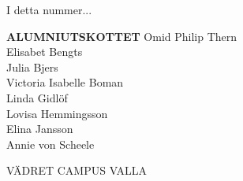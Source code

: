 \documentclass[10pt,final,hyphenatedtitles]{papertex}
\begin{document}
\begin{frontpage}
\begin{indexblock}{I detta nummer...}




\end{indexblock}



\begin{authorblock}
\textbf{ALUMNIUTSKOTTET}
Omid Philip Thern\\
Elisabet Bengts\\
Julia Bjers\\
Victoria Isabelle Boman\\
Linda Gidlöf\\
Lovisa Hemmingsson\\
Elina Jansson\\
Annie von Scheele\\
\end{authorblock}



\begin{weatherblock}{VÄDRET CAMPUS VALLA}
\end{weatherblock}
\end{frontpage}



\newsection{}



\newssep



\newssep











\newssep



\newssep



\clearpage


\end{document}
